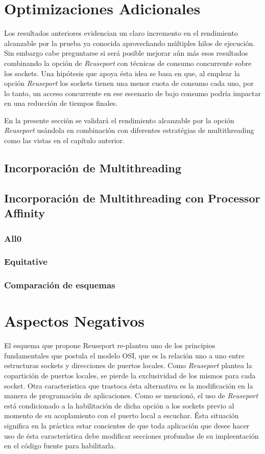 \section{Optimizaciones Adicionales}
Los resultados anteriores evidencian un claro incremento en el rendimiento alcanzable por la prueba ya conocida aprovechando múltiples hilos de ejecución. Sin embargo cabe preguntarse si será posible mejorar aún más esos resultados combinando la opción de \emph{Reuseport} con técnicas de consumo concurrente sobre los sockets. Una hipótesis que apoya ésta idea se basa en que, al emplear la opción \emph{Reuseport} los sockets tienen una menor cuota de consumo cada uno, por lo tanto, un acceso concurrente en ese escenario de bajo consumo podría impactar en una reducción de tiempos finales.

En la presente sección se validará el rendimiento alcanzable por la opción \emph{Reuseport} usándola en combinación con diferentes estratégias de multithreading como las vistas en el capítulo anterior.

\subsection{Incorporación de Multithreading}

\subsection{Incorporación de Multithreading con Processor Affinity}

\subsubsection{All0}
\subsubsection{Equitative}
\subsubsection{Comparación de esquemas}


\section{Aspectos Negativos}

El esquema que propone Reuseport re-plantea uno de los principios fundamentales que postula el modelo OSI, que es la relación uno a uno entre estructuras sockets y direcciones de puertos locales. Como \emph{Reuseport} plantea la copartición de puertos locales, se pierde la exclusividad de los mismos para cada socket. Otra caracteristica que trastoca ésta alternativa es la modificación en la manera de programación de aplicaciones. Como se mencionó, el uso de \emph{Reuseport} está condicionado a la habilitación de dicha opción a los sockets previo al momento de su acoplamiento con el puerto local a escuchar. Ésta situación significa en la práctica estar concientes de que toda aplicación que desee hacer uso de ésta característica debe modificar secciones profundas de su impleentación en el código fuente para habilitarla.

